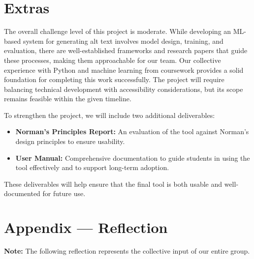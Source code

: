 \documentclass{article}
\begin{document}
\section{Extras}

\noindent
The overall challenge level of this project is moderate. While developing an
ML-based system for generating alt text involves model design, training, and
evaluation, there are well-established frameworks and research papers that guide
these processes, making them approachable for our team. Our collective
experience with Python and machine learning from coursework provides a solid
foundation for completing this work successfully. The project will require balancing technical development with accessibility
considerations, but its scope remains feasible within the given timeline.

\vspace{0.75em}

\noindent
To strengthen the project, we will include two additional deliverables:

\vspace{0.5em}

\begin{itemize}
    \setlength\itemsep{0.5em}
    \item \textbf{Norman’s Principles Report:} An evaluation of the tool against
    Norman’s design principles to ensure usability.
    \item \textbf{User Manual:} Comprehensive documentation to guide students in
    using the tool effectively and to support long-term adoption.
\end{itemize}

\vspace{0.5em}

\noindent
These deliverables will help ensure that the final tool is both usable and
well-documented for future use.

\newpage{}

\section*{Appendix --- Reflection}

\noindent\textbf{Note:} The following reflection represents the collective input of our entire group.
\end{document}
